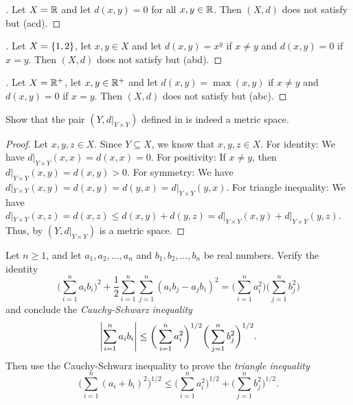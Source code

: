 \begin{proof}[]
  Let \(X = \mathbb{R}\) and let \(d(x, y) = 0\) for all \(x, y \in \mathbb{R}\).
  Then \((X, d)\) does not satisfy  but (acd).
\end{proof}

\begin{proof}[]
  Let \(X = \left\lbrace1, 2\right\rbrace\), let \(x, y \in X\) and let \(d(x, y) = x^y\) if \(x \neq y\) and \(d(x, y) = 0\) if \(x = y\).
  Then \((X, d)\) does not satisfy  but (abd).
\end{proof}

\begin{proof}[]
  Let \(X = \mathbb{R}^+\), let \(x, y \in \mathbb{R}^+\) and let \(d(x, y) = \max(x, y)\) if \(x \neq y\) and \(d(x, y) = 0\) if \(x = y\).
  Then \((X, d)\) does not satisfy  but (abc).
\end{proof}

\begin{ex}\label{ii:ex:1.1.4}
  Show that the pair \((Y, d|_{Y \times Y})\) defined in  is indeed a metric space.
\end{ex}

\begin{proof}
  Let \(x, y, z \in X\).
  Since \(Y \subseteq X\), we know that \(x, y, z \in X\).
  For identity:
  We have \(d|_{Y \times Y}(x, x) = d(x, x) = 0\).
  For positivity:
  If \(x \neq y\), then \(d|_{Y \times Y}(x, y) = d(x, y) > 0\).
  For symmetry:
  We have \(d|_{Y \times Y}(x, y) = d(x, y) = d(y, x) = d|_{Y \times Y}(y, x)\).
  For triangle inequality:
  We have \(d|_{Y \times Y}(x, z) = d(x, z) \leq d(x, y) + d(y, z) = d|_{Y \times Y}(x, y) + d|_{Y \times Y}(y, z)\).
  Thus, by  \((Y, d|_{Y \times Y})\) is a metric space.
\end{proof}

\begin{ex}\label{ii:ex:1.1.5}
  Let \(n \geq 1\), and let \(a_1, a_2, \dots, a_n\) and \(b_1, b_2, \dots, b_n\) be real numbers.
  Verify the identity
  \[
    \bigg(\sum_{i = 1}^n a_i b_i\bigg)^2 + \dfrac{1}{2} \sum_{i = 1}^n \sum_{j = 1}^n (a_i b_j - a_j b_i)^2 = \bigg(\sum_{i = 1}^n a_i^2\bigg) \bigg(\sum_{j = 1}^n b_j^2\bigg)
  \]
  and conclude the \emph{Cauchy-Schwarz inequality}
  \[
    \left\lvert\sum_{i = 1}^n a_i b_i\right\rvert \leq \bigg(\sum_{i = 1}^n a_i^2\bigg)^{1 / 2} \bigg(\sum_{j = 1}^n b_j^2\bigg)^{1 / 2}.
  \]
  Then use the Cauchy-Schwarz inequality to prove the \emph{triangle inequality}
  \[
    \bigg(\sum_{i = 1}^n (a_i + b_i)^2\bigg)^{1 / 2} \leq \bigg(\sum_{i = 1}^n a_i^2\bigg)^{1 / 2} + \bigg(\sum_{j = 1}^n b_j^2\bigg)^{1 / 2}.
  \]
\end{ex}

